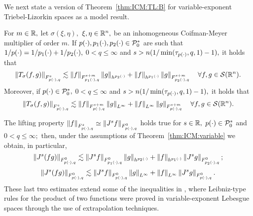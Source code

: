 We next state a version of Theorem~\ref{thm:ICM:TL:B} for variable-exponent Triebel-Lizorkin spaces as a model result.
\begin{theorem} \label{thm:ICM:variable} For $m \in \re,$ let $\sigma(\xi,\eta),$ $\xi,\eta\in\rn,$ be an inhomogeneous Coifman-Meyer multiplier of order $m.$ If  $\pp,\ppo,\ppt\in \mathcal{P}_0^*$  are such that $ {1}/{\pp} = {1}/{\ppo} + {1}/{\ppt},$   $0 < q \le \infty$ and  
$s > n(1/\min(\tau_{\pp},q,1)-1),$  it holds that
\begin{equation*}
\norm{T_\sigma(f,g)}{\itl{\pp}{s}{q}} \lesssim \norm{f}{\itl{\ppo}{s+m}{q}} \norm{g}{h^{\ppt}} +  \norm{f}{h^{\ppo}}   \norm{g}{\itl{\ppt}{s+m}{q}} \quad \forall f, g \in \sw.
\end{equation*}
Moreover, if $\pp\in \mathcal{P}_0^*,$     $0 < q \le \infty$ and  
$s > n(1/\min(\tau_{\pp},q,1)-1),$  it holds that
\begin{equation*}
\norm{T_\sigma(f,g)}{\itl{\pp}{s}{q}} \lesssim \norm{f}{\itl{\pp}{s+m}{q}} \norm{g}{L^\infty} +  \norm{f}{L^\infty}   \norm{g}{\itl{\pp}{s+m}{q}} \quad \forall f, g \in \sw.
\end{equation*}
\end{theorem}

The lifting property $ \norm{f}{\itl{\pp}{s}{q}}\simeq\norm{J^s f}{\itl{\pp}{0}{q}}$ holds true for $s \in \re,$  $\pp\in \mathcal{P}_0^*$  and $0<q\le\infty;$ then, under the assumptions of Theorem~\ref{thm:ICM:variable}  we obtain, in particular,
\begin{equation*}
\norm{J^s (fg)}{\itl{\pp}{0}{q}} \lesssim \norm{J^s f}{\itl{\ppo}{0}{q}} \norm{g}{h^{\ppt}} +  \norm{f}{h^{\ppo}}   \norm{J^sg}{\itl{\ppt}{0}{q}};
\end{equation*}
\begin{equation*}
\norm{J^s(fg)}{\itl{\pp}{0}{q}} \lesssim \norm{J^sf}{\itl{\pp}{0}{q}} \norm{g}{L^\infty} +  \norm{f}{L^\infty}   \norm{J^sg}{\itl{\pp}{0}{q}}.
\end{equation*}
These last two estimates  extend some of the inequalities in \cite[Theorem 1.2]{MR3513582}, where Leibniz-type rules for the product of two functions were proved in variable-exponent Lebesgue spaces through the use of extrapolation techniques.



